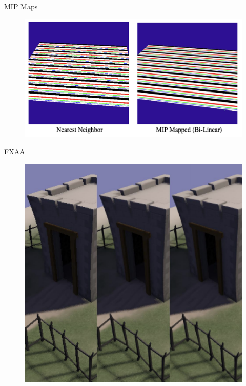\documentclass[table]{beamer}
\begin{document}
\begin{frame}[fragile]{MIP Maps}
    \begin{figure}
        \includegraphics[width=\linewidth]{./figures/mipmaps.png}
    \end{figure}
\end{frame}


\begin{frame}[fragile]{FXAA}
    \begin{figure}
        \includegraphics[width=\linewidth]{./figures/fxaacomparison.png}
    \end{figure}
\end{frame}
\end{document}
